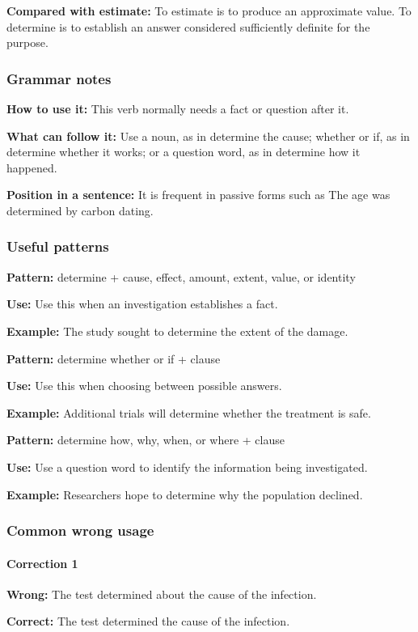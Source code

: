 \documentclass[11pt]{article}
\begin{document}
\textbf{Compared with estimate:} To estimate is to produce an approximate value. To determine is to establish an answer considered sufficiently definite for the purpose.

\subsubsection{Grammar notes}
\textbf{How to use it:} This verb normally needs a fact or question after it.

\textbf{What can follow it:} Use a noun, as in determine the cause; whether or if, as in determine whether it works; or a question word, as in determine how it happened.

\textbf{Position in a sentence:} It is frequent in passive forms such as The age was determined by carbon dating.

\subsubsection{Useful patterns}
\textbf{Pattern:} determine + cause, effect, amount, extent, value, or identity

\textbf{Use:} Use this when an investigation establishes a fact.

\textbf{Example:} The study sought to determine the extent of the damage.

\textbf{Pattern:} determine whether or if + clause

\textbf{Use:} Use this when choosing between possible answers.

\textbf{Example:} Additional trials will determine whether the treatment is safe.

\textbf{Pattern:} determine how, why, when, or where + clause

\textbf{Use:} Use a question word to identify the information being investigated.

\textbf{Example:} Researchers hope to determine why the population declined.

\subsubsection{Common wrong usage}
\paragraph{Correction 1}
\textbf{Wrong:} The test determined about the cause of the infection.

\textbf{Correct:} The test determined the cause of the infection.
\end{document}

